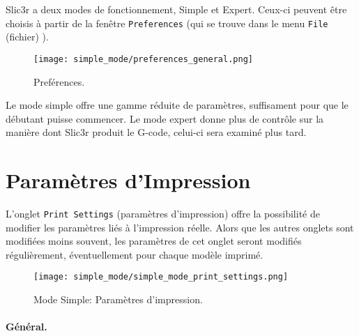\label{sec:simple_mode}

Slic3r a deux modes de fonctionnement, Simple et Expert. Ceux-ci peuvent \^etre choisis \`a partir de la fen\^etre \texttt{Preferences} (qui se trouve dans le menu  \texttt{File} (fichier) ).

\begin{figure}[ht]
\centering
\texttt{[image: simple\_mode/preferences\_general.png]}
\caption{Pref\'erences.}
\label{fig:preferences_general}
\end{figure}

Le mode simple offre une gamme r\'eduite de param\`etres, suffisament pour que le d\'ebutant puisse commencer. Le mode expert donne plus de contr\^ole sur la mani\`ere dont Slic3r produit le G-code, celui-ci sera examin\'e plus tard.

\section{Param\`etres d'Impression}

L'onglet \texttt{Print Settings} (param\`etres d'impression) 
offre la possibilit\'e de modifier les param\`etres li\'es \`a l'impression r\'eelle. Alors que les autres onglets sont modifi\'ees moins souvent, les param\`etres de cet onglet seront modifi\'es r\'eguli\`erement, \'eventuellement pour chaque mod\`ele imprim\'e.

\begin{figure}[ht]
\centering
\texttt{[image: simple\_mode/simple\_mode\_print\_settings.png]}
\caption{Mode Simple: Param\`etres d'impression.}
\label{fig:simple_mode_print_settings}
\end{figure}

\paragraph{G\'en\'eral.} %
\label{par:simple_general}


